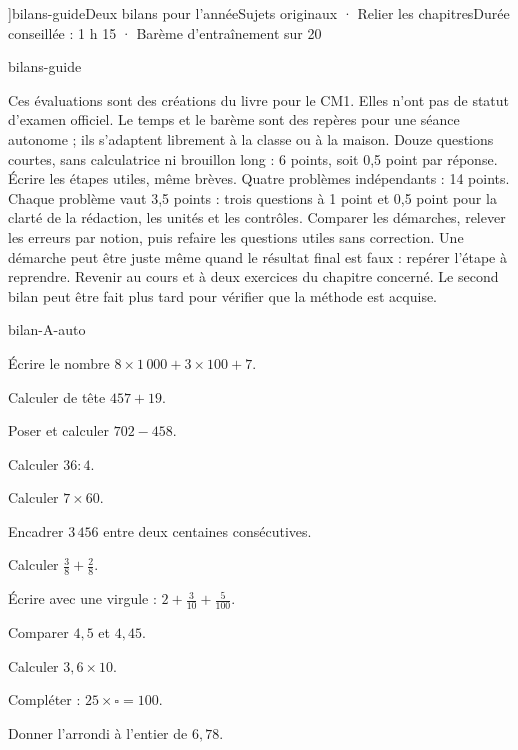 \editionPage[\pdfbookmark[0]{Deux bilans annuels}{bm-bilans-guide-parent}]{bilans-guide}{Deux bilans pour l’année}{Sujets originaux · Relier les chapitres}{Durée conseillée : 1 h 15 · Barème d’entraînement sur 20}
\begin{blocEdition}{bilans-guide}

Ces évaluations sont des créations du livre pour le CM1. Elles n’ont pas
de statut d’examen officiel. Le temps et le barème sont des repères pour
une séance autonome ; ils s’adaptent librement à la classe ou à la maison.
Douze questions courtes, sans calculatrice ni brouillon long : 6 points,
soit 0,5 point par réponse. Écrire les étapes utiles, même brèves.
Quatre problèmes indépendants : 14 points. Chaque problème vaut
3,5 points : trois questions à 1 point et 0,5 point pour la clarté de la
rédaction, les unités et les contrôles.
Comparer les démarches, relever les erreurs par notion, puis refaire
les questions utiles sans correction. Une démarche peut être juste
même quand le résultat final est faux : repérer l’étape à reprendre.
Revenir au cours et à deux exercices du chapitre concerné. Le second
bilan peut être fait plus tard pour vérifier que la méthode est acquise.

\end{blocEdition}
\begin{blocEdition}{bilan-A-auto}
\begin{questions}
\item Écrire le nombre $8\times1\,000+3\times100+7$.
\item Calculer de tête $457+19$.
\item Poser et calculer $702-458$.
\item Calculer $36:4$.
\item Calculer $7\times60$.
\item Encadrer $3\,456$ entre deux centaines consécutives.
\item Calculer $\frac38+\frac28$.
\item Écrire avec une virgule : $2+\frac3{10}+\frac5{100}$.
\item Comparer $4{,}5$ et $4{,}45$.
\item Calculer $3{,}6\times10$.
\item Compléter : $25\times\square=100$.
\item Donner l’arrondi à l’entier de $6{,}78$.\end{questions}
\end{blocEdition}
